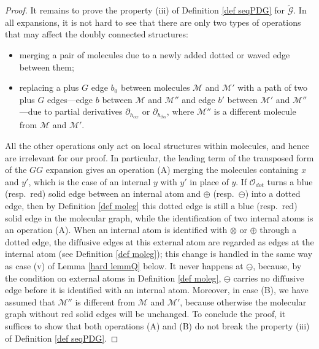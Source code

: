 \documentclass{article}
\newcommand{\1}{\mathds{1}}
\numberwithin{equation}{section}
\newcommand{\al}{\alpha}
\renewcommand{\cal}{\mathcal}
\newcommand{\wt}{\widetilde}
\newcommand{\dashed}{\text{diffusive}}
\theoremstyle{plain} %
\theoremstyle{remark}
\begin{document}
\begin{proof}
It remains to prove the property (iii) of Definition \ref{def seqPDG} for $\wt{\cal G}$. In all expansions, it is not hard to see that
there are only two types of operations that may affect the doubly connected structures:
\begin{itemize}
\item[(A)] merging a pair of molecules due to a newly added dotted or waved edge between them;

\item[(B)] replacing a plus $G$ edge $b_0$ between molecules $\cal M$ and $\cal M'$ with a path of two plus $G$ edges---edge $b$ between $\cal M$ and $\cal M''$ and edge $b'$ between $\cal M'$ and $\cal M''$---due to partial derivatives $\partial_{h_{\al x}}$ or $\partial_{h_{ \beta\al}}$, where $\cal M''$ is a different molecule from $\cal M$ and $\cal M'$.
\end{itemize}
All the other operations only act on local structures within molecules, and hence are irrelevant for our proof. In particular, the leading term of the transposed form of the $GG$ expansion gives an operation (A) merging the molecules containing $x$ and $y'$, which is the case of an internal $y$ with $y'$ in place of $y$. If $\cal O_{dot}$ turns a blue (resp.~red) solid edge between an internal atom and $\oplus$ (resp.~$\ominus$) into a dotted edge, then by Definition \ref{def moleg} this dotted edge is still a blue (resp.~red) solid edge in the molecular graph, while the identification of two internal atoms is an operation (A). When an internal atom is identified with $\otimes$ or $\oplus$ through a dotted edge, the $\dashed$ edges at this external atom are regarded as edges at the internal atom (see Definition \ref{def moleg}); this change is handled in the same way as case (v) of Lemma \ref{hard lemmQ} below. It never happens at $\ominus$, because, by the condition on external atoms in Definition \ref{def moleg}, $\ominus$ carries no $\dashed$ edge before it is identified with an internal atom. Moreover, in case (B), we have assumed that $\cal M''$ is different from $\cal M$ and $\cal M'$, because otherwise the molecular graph without red solid edges will be unchanged. To conclude the proof, it suffices to show that both operations (A) and (B) do not break the property (iii) of Definition \ref{def seqPDG}. 




\end{proof}
\end{document}
